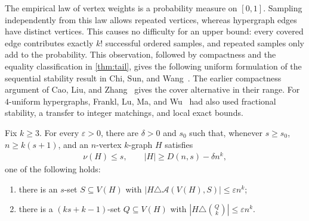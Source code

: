 The empirical law of vertex weights is a probability measure on $[0,1]$. Sampling independently from this law allows repeated vertices, whereas hypergraph edges have distinct vertices. This causes no difficulty for an upper bound: every covered edge contributes exactly $k!$ successful ordered samples, and repeated samples only add to the probability. This observation, followed by compactness and the equality classification in \cref{thm:tail}, gives the following uniform formulation of the sequential stability result in Chi, Sun, and Wang~\cite[Lemma 8.3]{CSW2026}. The earlier compactness argument of Cao, Liu, and Zhang~\cite[Theorem 4.1]{CLZ2026} gives the cover alternative in their range. For $4$-uniform hypergraphs, Frankl, Lu, Ma, and Wu~\cite[Sections 2--4]{FLMW2026} had also used fractional stability, a transfer to integer matchings, and local exact bounds.
\begin{proposition}\label{prop:matching-stability}
Fix $k\ge3$. For every $\varepsilon>0$, there are $\delta>0$ and $s_0$ such that, whenever $s\ge s_0$, $n\ge k(s+1)$, and an $n$-vertex $k$-graph $H$ satisfies
\begin{align*}
\nu(H)\le s,
\qquad
|H|\ge D(n,s)-\delta n^k,
\end{align*}
one of the following holds:
\begin{enumerate}[label=(\roman*)]
\item there is an $s$-set $S\subseteq V(H)$ with $|H\triangle\mathcal A(V(H),S)|\le\varepsilon n^k$;
\item there is a $(ks+k-1)$-set $Q\subseteq V(H)$ with $|H\triangle\binom Qk|\le\varepsilon n^k$.
\end{enumerate}
\end{proposition}

